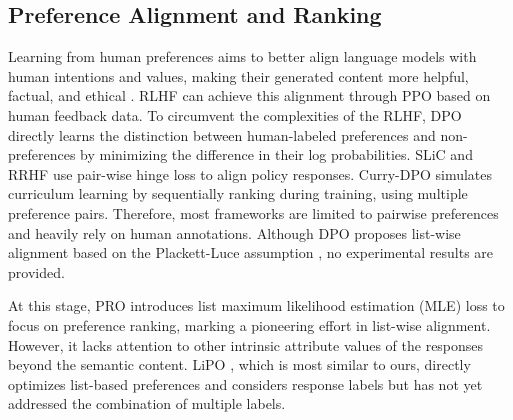 \subsection{Preference Alignment and Ranking}
Learning from human preferences \cite{christiano2017deep} aims to better align language models with human intentions and values, making their generated content more helpful, factual, and ethical \cite{ouyang2022training}.
RLHF  \cite{ouyang2022training, stiennon2020learning}  can achieve this alignment through PPO\cite{schulman2017proximal} based on human feedback data.
To circumvent the complexities of the RLHF, DPO \cite{rafailov2024direct} directly learns the distinction between human-labeled preferences and non-preferences by minimizing the difference in their log probabilities.
SLiC \cite{zhao2023slic} and RRHF \cite{yuan2024rrhf} use pair-wise hinge loss to align policy responses.
Curry-DPO \cite{pattnaik2024curry} simulates curriculum learning by sequentially ranking during training, using multiple preference pairs.
Therefore, most frameworks \cite{azar2024general, liu2023statistical} are limited to pairwise preferences and heavily rely on human annotations.
Although DPO proposes list-wise alignment based on the Plackett-Luce assumption \cite{luce1959individual}, no experimental results are provided.

At this stage, PRO \cite{song2024preference} introduces list maximum likelihood estimation (MLE) loss to focus on preference ranking, marking a pioneering effort in list-wise alignment.
However, it lacks attention to other intrinsic attribute values of the responses beyond the semantic content.
LiPO \cite{liu2024lipo}, which is most similar to ours, directly optimizes list-based preferences and considers response labels but has not yet addressed the combination of multiple labels.

